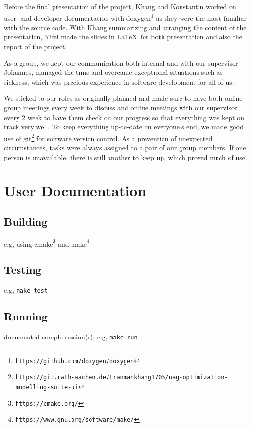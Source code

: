 \documentclass{book}
\begin{document}
Before the final presentation of the project, Khang and Konstantin worked on user- and developer-documentation with doxygen\footnote{\tt https://github.com/doxygen/doxygen} as they were the most familiar with the source code. With Khang summarizing and arranging the content of the presentation, Yifei made the slides in \LaTeX\ for both presentation and also the report of the project. \par
\vspace{1em}
As a group, we kept our communication both internal and with our supervisor Johannes, managed the time and overcame exceptional situations such as sickness, which was precious experience in software development for all of us.\par
We sticked to our roles as originally planned and made sure to have both online group meetings every week to discuss and online meetings with our supervisor every 2 week to have them check on our progress so that everything was kept on track very well. To keep everything up-to-date on everyone's end, we made good use of git\footnote{\tt https://git.rwth-aachen.de/tranmankhang1705/nag-optimization-modelling-suite-ui} for software version control. As a prevention of unexpected circumstances, tasks were always assigned to a pair of our group members. If one person is unavailable, there is still another to keep up, which proved much of use.





\appendix

\chapter{User Documentation} \label{ch:userdoc}

\section{Building}

e.g, using cmake\footnote{\tt https://cmake.org/} and make\footnote{\tt https://www.gnu.org/software/make/}

\section{Testing}

e.g, \verb!make test!

\section{Running}

documented sample session(s); e.g, \verb!make run!
\end{document}
